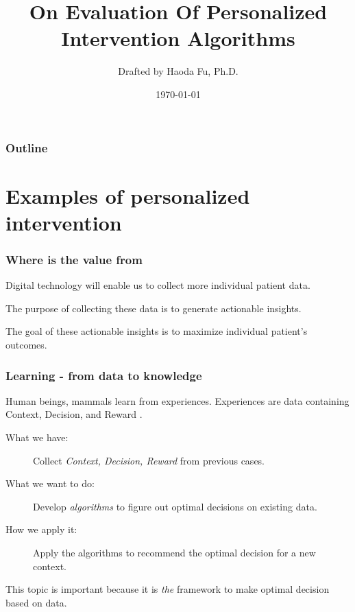\documentclass{beamer}
\title{On Evaluation Of Personalized Intervention Algorithms}    %
\author{Drafted by Haoda Fu, Ph.D.}                 %
\institute{Eli Lilly and Company}      %
\date{\today}
\begin{document}
\begin{frame}
  \titlepage
\end{frame}

\section[Outline] {}

\begin{frame}
	\frametitle{Outline}
	\tableofcontents
\end{frame}

\section{Examples of personalized intervention}


\begin{frame}
	\frametitle{Where is the value from}
	 \begin{description}[<+->]
	 	\item[Context:] Digital technology will enable us to collect more individual patient data.
	 	\item[Decision:] The purpose of collecting these data is to generate actionable insights. 
	 	\item[Reward:] The goal of these actionable insights is to maximize individual patient's outcomes.
	 \end{description}	
\end{frame}


\begin{frame}
	\frametitle{Learning - from data to knowledge}
	Human beings, mammals learn from experiences. Experiences are data containing {\color{LillyRed} Context, Decision}, and {\color{LillyRed} Reward} .
	
	\begin{description}
		\item[What we have:]  Collect  \emph{Context, Decision, Reward} from previous cases.
		\item[What we want to do:] Develop \emph{algorithms} to figure out optimal decisions on existing data.
		\item[How we apply it:] Apply the algorithms to recommend the optimal decision for a new context.
		\end{description}

\pause This topic is important because it is \emph{the} framework to make optimal decision	based on data.
\end{frame}
\end{document}
